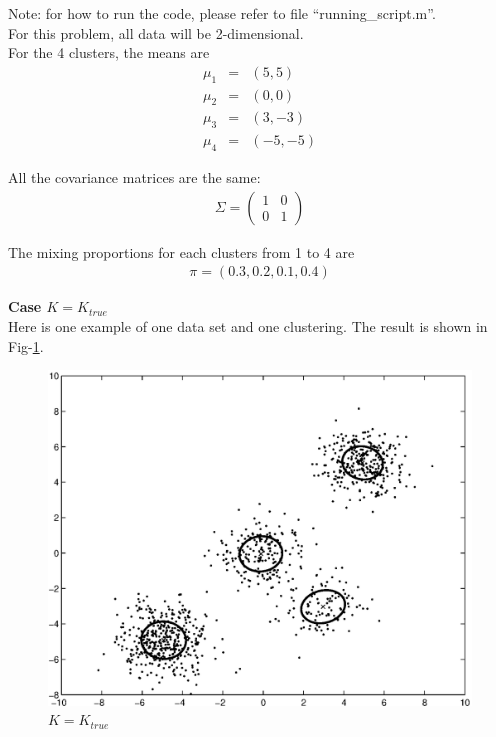 \documentclass[12pt]{article}
\begin{document}
Note: for how to run the code, please refer to file ``running\_script.m''. \\


For this problem, all data will be 2-dimensional. \\

For the 4 clusters, the means are
\begin{eqnarray*}
  \mu_1 &=& (5, 5) \\
  \mu_2 &=& (0, 0) \\
  \mu_3 &=& (3, -3) \\
  \mu_4 &=& (-5, -5)
\end{eqnarray*}

All the covariance matrices are the same:
\begin{eqnarray*}
  \Sigma =
  \begin{pmatrix}
    1 & 0 \\
    0 & 1
  \end{pmatrix}
\end{eqnarray*}

The mixing proportions for each clusters from 1 to 4 are
\begin{eqnarray*}
  \pi = (0.3, 0.2, 0.1, 0.4)
\end{eqnarray*}

\textbf{Case $K = K_{true}$} \\

Here is one example of one data set and one clustering. The result is shown in Fig-\ref{fig:c1}. \\

\begin{figure}[ht!]
  \centering
  \includegraphics[width=0.7 \textwidth]{c1}
  \caption{$K = K_{true}$ \label{fig:c1}}
\end{figure}
\end{document}

